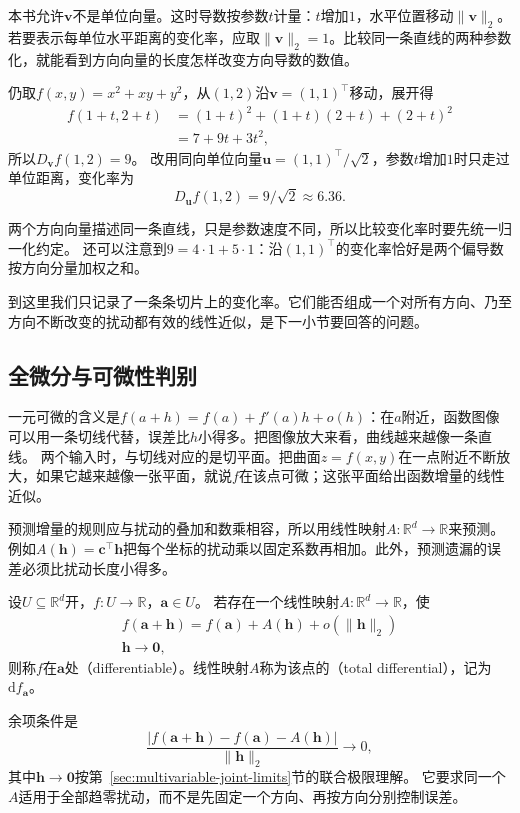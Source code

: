 本书允许$\bm v$不是单位向量。这时导数按参数$t$计量：$t$增加$1$，水平位置移动$\lVert\bm v\rVert_2$。若要表示每单位水平距离的变化率，应取$\lVert\bm v\rVert_2=1$。比较同一条直线的两种参数化，就能看到方向向量的长度怎样改变方向导数的数值。
\begin{example}[沿对角方向的方向导数]
\label{ex:multivariable-diagonal-directional-derivative}
仍取$f(x,y)=x^2+xy+y^2$，从$(1,2)$沿$\bm v=(1,1)^\top$移动，展开得
\[
 \begin{aligned}
 f(1+t,2+t)&=(1+t)^2+(1+t)(2+t)+(2+t)^2\\
 &=7+9t+3t^2,
 \end{aligned}
\]
所以$D_{\bm v}f(1,2)=9$。
改用同向单位向量$\bm u=(1,1)^\top/\sqrt2$，参数$t$增加$1$时只走过单位距离，变化率为
\[
 D_{\bm u}f(1,2)=9/\sqrt2\approx6.36.
\]
\end{example}

两个方向向量描述同一条直线，只是参数速度不同，所以比较变化率时要先统一归一化约定。
还可以注意到$9=4\cdot1+5\cdot1$：沿$(1,1)^\top$的变化率恰好是两个偏导数按方向分量加权之和。

到这里我们只记录了一条条切片上的变化率。它们能否组成一个对所有方向、乃至方向不断改变的扰动都有效的线性近似，是下一小节要回答的问题。

\subsection{全微分与可微性判别}
\label{sec:multivariable-total-differentiation}

一元可微的含义是$f(a+h)=f(a)+f'(a)h+o(h)$：在$a$附近，函数图像可以用一条切线代替，误差比$h$小得多。把图像放大来看，曲线越来越像一条直线。
两个输入时，与切线对应的是切平面。把曲面$z=f(x,y)$在一点附近不断放大，如果它越来越像一张平面，就说$f$在该点可微；这张平面给出函数增量的线性近似。

预测增量的规则应与扰动的叠加和数乘相容，所以用线性映射$A:\mathbb R^d\to\mathbb R$来预测。
例如$A(\bm h)=\bm c^\top\bm h$把每个坐标的扰动乘以固定系数再相加。此外，预测遗漏的误差必须比扰动长度小得多。
\begin{definition}[多元标量函数的可微性与全微分]
\label{def:multivariable-total-differential}
设$U\subseteq\mathbb R^d$开，$f:U\to\mathbb R$，$\bm a\in U$。
若存在一个线性映射$A:\mathbb R^d\to\mathbb R$，使
\begin{equation}
\begin{gathered}
f(\bm a+\bm h)=f(\bm a)+A(\bm h)+o(\lVert\bm h\rVert_2)\\
\bm h\to\bm0,
\end{gathered}
\label{eq:analysis-total-differentiability}
\end{equation}
则称$f$在$\bm a$处（differentiable）。线性映射$A$称为该点的（total differential），记为$\mathrm df_{\bm a}$。
\end{definition}
余项条件是
\[
 \frac{|f(\bm a+\bm h)-f(\bm a)-A(\bm h)|}{\lVert\bm h\rVert_2}\longrightarrow0,
\]
其中$\bm h\to\bm 0$按第~\ref{sec:multivariable-joint-limits}节的联合极限理解。
它要求同一个$A$适用于全部趋零扰动，而不是先固定一个方向、再按方向分别控制误差。

